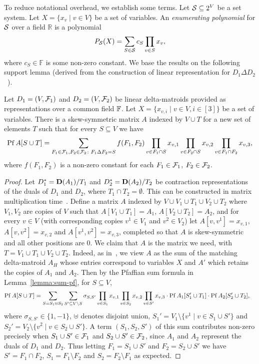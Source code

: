 To reduce notational overhead, we establish some terms. Let $\mathcal S \subseteq 2^V$ be a set system.
Let $X=\{x_v \mid v \in V\}$ be a set of variables. An \emph{enumerating polynomial} for $\mathcal S$ over a field $\mathbb{R}$
is a polynomial
\[
  P_\mathcal S(X) = \sum_{S \in \mathcal S} c_S \prod_{v \in S} x_v,
\]
where $c_S \in \mathbb{F}$ is some non-zero constant.
We base the results on the following support lemma (derived from the construction of linear representation for $D_1 \Delta D_2$~\cite{KW24}).

\begin{lemma} \label{lm:delta-combo-polynomial}
  Let $D_1=(V,\mathcal F_1)$ and $D_2=(V,\mathcal F_2)$ be linear delta-matroids provided as representations over a common field $\mathbb F$.
  Let $X=\{x_{v,i} \mid v \in V, i \in [3]\}$ be a set of variables.
  There is a skew-symmetric matrix $A$ indexed by $V \cup T$ for a new set of elements $T$
  such that for every $S \subseteq V$ we have
  \[
    \operatorname{Pf} A[S \cup T] = \sum_{F_1 \in \mathcal F_1, F_2 \in \mathcal F_2 \colon F_1 \Delta F_2=S}
    f(F_1,F_2) \prod_{v \in F_1 \cap S} x_{v,1} \prod_{v \in F_2 \cap S} x_{v,2} \prod_{v \in F_1 \cap F_2} x_{v,3},
  \]
  where $f(F_1,F_2)$ is a non-zero constant for each $F_1 \in \mathcal F_1$, $F_2 \in \mathcal F_2$.   
\end{lemma}
\begin{proof}
  Let $D_1^*=\mathbf D(A_1)/T_1$ and $D_2^*=\mathbf D(A_2)/T_2$ be contraction representations of the duals
  of $D_1$ and $D_2$, where $T_1 \cap T_2=\emptyset$. This can be constructed in matrix multiplication
  time~\cite{KW24}. 
  Define a matrix $A$ indexed by $V \cup V_1 \cup T_1 \cup V_2 \cup T_2$
  where $V_1, V_2$ are copies of $V$ such that
  $A[V_1 \cup T_1]=A_1$, $A[V_2 \cup T_2]=A_2$,
  and for every $v \in V$ (with corresponding copies $v^1 \in V_1$ and $v^2 \in V_2$)
  let $A[v,v^1]=x_{v,1}$, $A[v,v^2]=x_{v,2}$ and $A[v^1,v^2]=x_{v,3}$,
  completed so that $A$ is skew-symmetric and all other positions are 0.
  We claim that $A$ is the matrix we need, with $T=V_1 \cup T_1 \cup V_2 \cup T_2$.
  Indeed, as in~\cite{KW24}, we view $A$ as the sum of the matching delta-matroid $A_H$
  whose entries correspond to variables $X$ and $A'$ which retains the copies of $A_1$ and $A_2$.
  Then by the Pfaffian sum formula in Lemma~\ref{lemma:sum-pf}, for $S \subseteq V$,
  \begin{align*}
    \operatorname{Pf} A[S \cup T] &= \sum_{S=S_1 \uplus S_2} \sum_{S' \subseteq V \setminus S}
    \sigma_{S, S'} \prod_{v \in S_1} x_{v,1} \prod_{v \in S_2} x_{v,2} \prod_{v \in S'} x_{v,3} \cdot
                      \operatorname{Pf} A_1[S_1' \cup T_1] \cdot
                      \operatorname{Pf} A_2[S_2' \cup T_2],
  \end{align*}
  where $\sigma_{S,S'} \in \{ 1, -1 \}$, $\uplus$ denotes disjoint union,
  $S_1'=V_1 \setminus \{v^1 \mid v \in S_1 \cup S'\}$
  and $S_2'=V_2 \setminus \{v^2 \mid v \in S_2 \cup S'\}$.
  A term $(S_1,S_2,S')$ of this sum contributes non-zero precisely when
  $S_1 \cup S' \in \mathcal F_1$ and $S_2 \cup S' \in \mathcal F_2$, since $A_1$ and $A_2$
  represent the duals of $D_1$ and $D_2$. Thus letting $F_1=S_1 \cup S'$
  and $F_2=S_2 \cup S'$ we have $S'=F_1 \cap F_2$, $S_1=F_1 \setminus F_2$
  and $S_2=F_2 \setminus F_1$ as expected. 
\end{proof}

